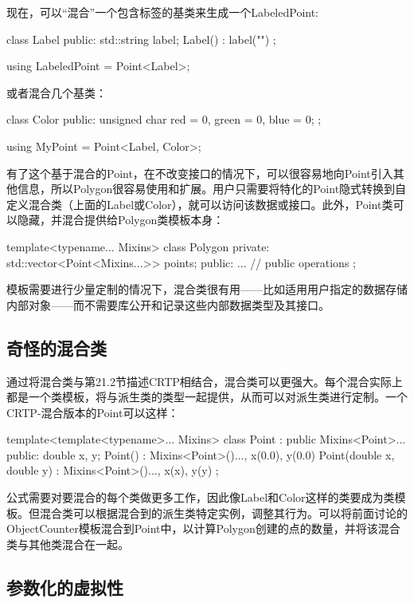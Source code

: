 现在，可以“混合”一个包含标签的基类来生成一个LabeledPoint:

\begin{cpp}
class Label {
	public:
	std::string label;
	Label() : label("") { }
};

using LabeledPoint = Point<Label>;
\end{cpp}

或者混合几个基类：

\begin{cpp}
class Color {
	public:
	unsigned char red = 0, green = 0, blue = 0;
};

using MyPoint = Point<Label, Color>;
\end{cpp}

有了这个基于混合的Point，在不改变接口的情况下，可以很容易地向Point引入其他信息，所以Polygon很容易使用和扩展。用户只需要将特化的Point隐式转换到自定义混合类（上面的Label或Color），就可以访问该数据或接口。此外，Point类可以隐藏，并混合提供给Polygon类模板本身：

\begin{cpp}
template<typename... Mixins>
class Polygon {
	private:
	std::vector<Point<Mixins...>> points;
	public:
	... // public operations
};
\end{cpp}

模板需要进行少量定制的情况下，混合类很有用——比如适用用户指定的数据存储内部对象——而不需要库公开和记录这些内部数据类型及其接口。

\subsection{奇怪的混合类}

通过将混合类与第21.2节描述CRTP相结合，混合类可以更强大。每个混合实际上都是一个类模板，将与派生类的类型一起提供，从而可以对派生类进行定制。一个CRTP-混合版本的Point可以这样：

\begin{cpp}
template<template<typename>... Mixins>
class Point : public Mixins<Point>... {
	public:
	double x, y;
	Point() : Mixins<Point>()..., x(0.0), y(0.0) { }
	Point(double x, double y) : Mixins<Point>()..., x(x), y(y) { }
};
\end{cpp}

公式需要对要混合的每个类做更多工作，因此像Label和Color这样的类要成为类模板。但混合类可以根据混合到的派生类特定实例，调整其行为。可以将前面讨论的ObjectCounter模板混合到Point中，以计算Polygon创建的点的数量，并将该混合类与其他类混合在一起。

\subsection{参数化的虚拟性}


